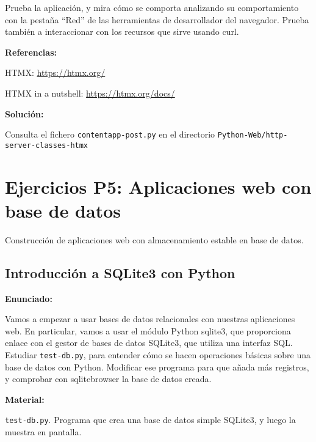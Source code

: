 {Prueba la aplicación, y mira cómo se comporta analizando su comportamiento con la pestaña ``Red'' de las herramientas de desarrollador del navegador. Prueba también a interaccionar con los recursos que sirve usando curl.

\textbf{Referencias:}

HTMX: \url{https://htmx.org/}

HTMX in a nutshell: \url{https://htmx.org/docs/}

\textbf{Solución:}

Consulta el fichero \texttt{contentapp-post.py} en el directorio \texttt{Python-Web/http-server-classes-htmx}


\section{Ejercicios P5: Aplicaciones web con base de datos}

Construcción de aplicaciones web con almacenamiento estable en base de datos.

\subsection{Introducción a SQLite3 con Python}
\label{subsec:sqlite3-python}

\textbf{Enunciado:}

Vamos a empezar a usar bases de datos relacionales con nuestras aplicaciones web. En particular, vamos a usar el módulo Python sqlite3, que proporciona enlace con el gestor de bases de datos SQLite3, que utiliza una interfaz SQL. Estudiar \texttt{test-db.py}, para entender cómo se hacen operaciones básicas sobre una base de datos con Python. Modificar ese programa para que añada más registros, y comprobar con sqlitebrowser la base de datos creada.

\textbf{Material:}

\texttt{test-db.py}. Programa que crea una base de datos simple SQLite3, y luego la muestra en pantalla.

}
